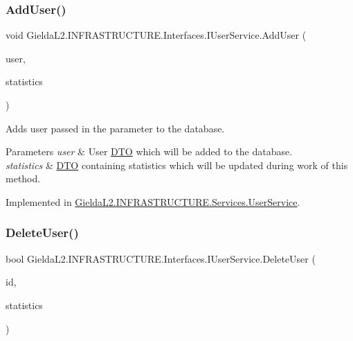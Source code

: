 \subsubsection{\texorpdfstring{AddUser()}{AddUser()}}
{\footnotesize\ttfamily void Gielda\+L2.\+I\+N\+F\+R\+A\+S\+T\+R\+U\+C\+T\+U\+R\+E.\+Interfaces.\+I\+User\+Service.\+Add\+User (\begin{DoxyParamCaption}\item[{\mbox{\hyperlink{class_gielda_l2_1_1_i_n_f_r_a_s_t_r_u_c_t_u_r_e_1_1_d_t_o_1_1_user_d_t_o}{User\+D\+TO}}}]{user,  }\item[{\mbox{\hyperlink{class_gielda_l2_1_1_i_n_f_r_a_s_t_r_u_c_t_u_r_e_1_1_d_t_o_1_1_statistics_d_t_o}{Statistics\+D\+TO}}}]{statistics }\end{DoxyParamCaption})}



Adds user passed in the parameter to the database. 


\begin{DoxyParams}{Parameters}
{\em user} & User \mbox{\hyperlink{namespace_gielda_l2_1_1_i_n_f_r_a_s_t_r_u_c_t_u_r_e_1_1_d_t_o}{D\+TO}} which will be added to the database.\\
\hline
{\em statistics} & \mbox{\hyperlink{namespace_gielda_l2_1_1_i_n_f_r_a_s_t_r_u_c_t_u_r_e_1_1_d_t_o}{D\+TO}} containing statistics which will be updated during work of this method.\\
\hline
\end{DoxyParams}


Implemented in \mbox{\hyperlink{class_gielda_l2_1_1_i_n_f_r_a_s_t_r_u_c_t_u_r_e_1_1_services_1_1_user_service_a0758f1bb59fe3430fc4122347e82bccf}{Gielda\+L2.\+I\+N\+F\+R\+A\+S\+T\+R\+U\+C\+T\+U\+R\+E.\+Services.\+User\+Service}}.

\mbox{\label{interface_gielda_l2_1_1_i_n_f_r_a_s_t_r_u_c_t_u_r_e_1_1_interfaces_1_1_i_user_service_a3b6080d304c489e6876694388a692682}} 
\subsubsection{\texorpdfstring{DeleteUser()}{DeleteUser()}}
{\footnotesize\ttfamily bool Gielda\+L2.\+I\+N\+F\+R\+A\+S\+T\+R\+U\+C\+T\+U\+R\+E.\+Interfaces.\+I\+User\+Service.\+Delete\+User (\begin{DoxyParamCaption}\item[{int}]{id,  }\item[{\mbox{\hyperlink{class_gielda_l2_1_1_i_n_f_r_a_s_t_r_u_c_t_u_r_e_1_1_d_t_o_1_1_statistics_d_t_o}{Statistics\+D\+TO}}}]{statistics }\end{DoxyParamCaption})}



